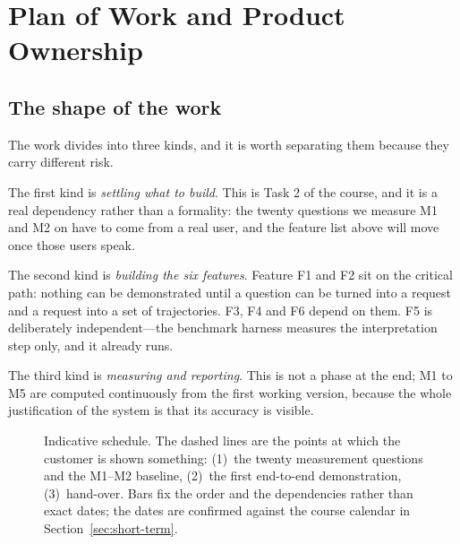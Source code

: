\documentclass[12pt,a4paper]{report}
\begin{document}
\chapter{Plan of Work and Product Ownership}
\label{ch:plan}

\section{The shape of the work}

The work divides into three kinds, and it is worth separating them because they
carry different risk.

The first kind is \emph{settling what to build}. This is Task 2 of the course,
and it is a real dependency rather than a formality: the twenty questions we
measure M1 and M2 on have to come from a real user, and the feature list above
will move once those users speak.

The second kind is \emph{building the six features}. Feature F1 and F2 sit on
the critical path: nothing can be demonstrated until a question can be turned
into a request and a request into a set of trajectories. F3, F4 and F6 depend on
them. F5 is deliberately independent---the benchmark harness measures the
interpretation step only, and it already runs.

The third kind is \emph{measuring and reporting}. This is not a phase at the
end; M1 to M5 are computed continuously from the first working version, because
the whole justification of the system is that its accuracy is visible.

\begin{figure}[H]
  \centering
  \caption{Indicative schedule. The dashed lines are the points at which the
    customer is shown something: (1)~the twenty measurement questions and the
    M1--M2 baseline, (2)~the first end-to-end demonstration, (3)~hand-over.
    Bars fix the order and the dependencies rather than exact dates; the dates
    are confirmed against the course calendar in
    Section~\ref{sec:short-term}.}
  \label{fig:plan}
\end{figure}
\end{document}
